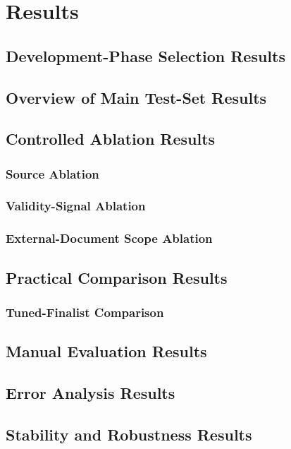 \chapter{Results}
\label{cha:results}

\section{Development-Phase Selection Results}
\label{dev-results}

\section{Overview of Main Test-Set Results}
\label{sec:overview-main-test-set-results}

\section{Controlled Ablation Results}
\label{sec:controlled-ablation-results}

\subsection{Source Ablation}
\label{sec:source-ablation}

\subsection{Validity-Signal Ablation}
\label{sec:validity-signal-ablation}

\subsection{External-Document Scope Ablation}
\label{sec:external-document-scope-ablation}

\section{Practical Comparison Results}
\label{sec:practical-comparison-results}

\subsection{Tuned-Finalist Comparison}
\label{sec:tuned-finalist-comparison}

\section{Manual Evaluation Results}
\label{sec:manual-evaluation-results}

\section{Error Analysis Results}
\label{sec:error-analysis-results}

\section{Stability and Robustness Results}
\label{sec:stability-robustness-results}
